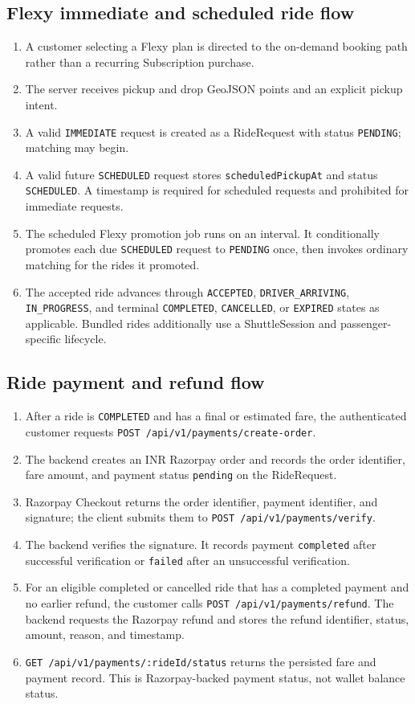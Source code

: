 \documentclass[11pt,a4paper]{article}
\newcommand{\code}[1]{\texttt{#1}}
\begin{document}
\subsection{Flexy immediate and scheduled ride flow}
\begin{enumerate}
  \item A customer selecting a Flexy plan is directed to the on-demand booking path rather than a recurring Subscription purchase.
  \item The server receives pickup and drop GeoJSON points and an explicit pickup intent.
  \item A valid \code{IMMEDIATE} request is created as a RideRequest with status \code{PENDING}; matching may begin.
  \item A valid future \code{SCHEDULED} request stores \code{scheduledPickupAt} and status \code{SCHEDULED}. A timestamp is required for scheduled requests and prohibited for immediate requests.
  \item The scheduled Flexy promotion job runs on an interval. It conditionally promotes each due \code{SCHEDULED} request to \code{PENDING} once, then invokes ordinary matching for the rides it promoted.
  \item The accepted ride advances through \code{ACCEPTED}, \code{DRIVER\_ARRIVING}, \code{IN\_PROGRESS}, and terminal \code{COMPLETED}, \code{CANCELLED}, or \code{EXPIRED} states as applicable. Bundled rides additionally use a ShuttleSession and passenger-specific lifecycle.
\end{enumerate}

\subsection{Ride payment and refund flow}
\begin{enumerate}
  \item After a ride is \code{COMPLETED} and has a final or estimated fare, the authenticated customer requests \code{POST /api/v1/payments/create-order}.
  \item The backend creates an INR Razorpay order and records the order identifier, fare amount, and payment status \code{pending} on the RideRequest.
  \item Razorpay Checkout returns the order identifier, payment identifier, and signature; the client submits them to \code{POST /api/v1/payments/verify}.
  \item The backend verifies the signature. It records payment \code{completed} after successful verification or \code{failed} after an unsuccessful verification.
  \item For an eligible completed or cancelled ride that has a completed payment and no earlier refund, the customer calls \code{POST /api/v1/payments/refund}. The backend requests the Razorpay refund and stores the refund identifier, status, amount, reason, and timestamp.
  \item \code{GET /api/v1/payments/:rideId/status} returns the persisted fare and payment record. This is Razorpay-backed payment status, not wallet balance status.
\end{enumerate}
\end{document}
